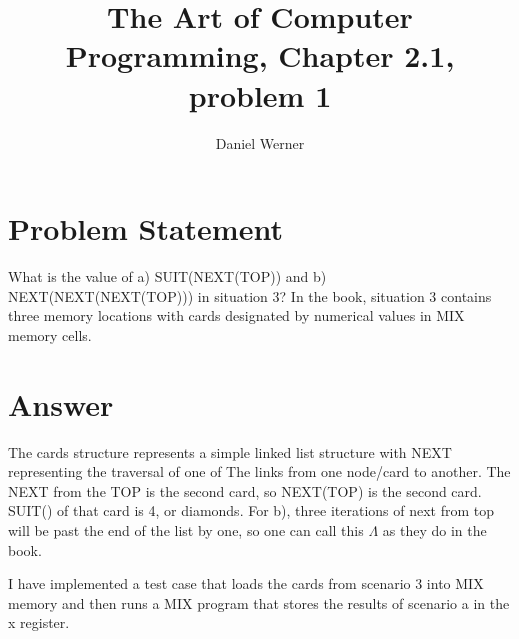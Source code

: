 \documentclass{article}
\title{The Art of Computer Programming, Chapter 2.1, problem 1}
\author{Daniel Werner}
\begin{document}
\maketitle

\section*{
    Problem Statement
}

What is the value of a) SUIT(NEXT(TOP)) and b) NEXT(NEXT(NEXT(TOP))) in situation 3?  In the book, situation 3
contains three memory locations with cards designated by numerical values in MIX memory cells.

\section*{
    Answer
}

The cards structure represents a simple linked list structure with NEXT representing the traversal of one of The
links from one node/card to another.  The NEXT from the TOP is the second card, so NEXT(TOP) is the second card. SUIT()
of that card is 4, or diamonds.  For b), three iterations of next from top will be past the end of the list by one, so
one can call this $\Lambda$ as they do in the book.

\par

I have implemented a test case that loads the cards from scenario 3 into MIX memory and then runs a MIX program that
stores the results of scenario a in the x register.
\end{document}
